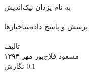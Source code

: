 \begin{titlepage}
\begin{center}
{\nastaliq
به نام یزدان نیک‌اندیش\\
\vspace{10ex}
\hrulefill\\[0.3cm]
{\Huge
پرسش و پاسخ داده‌ساختارها
}\\[0.3cm]
\hrulefill\\
\vfill
تالیف
\\[0.4cm]
مسعود فلاح‌پور
\vfill
مهر ۱۳۹۳
\\[0.3cm]
نگارش {$0\mathrm{.}1$}
}

\end{center}
\end{titlepage}